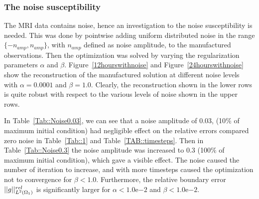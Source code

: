 \documentclass[11pt,a4paper]{article}
\begin{document}
\subsubsection{The noise susceptibility}
The MRI data contains noise, hence an investigation to the noise susceptibility is needed. This was done by pointwise adding uniform distributed noise in the range $\lbrace -n_{amp} , n_{amp} \rbrace $, with $n_{amp}$ defined as noise amplitude, to the manufactured observations. Then the optimization was solved by varying the regularization parameters $\alpha$ and $\beta$. Figure~\ref{12hourswithnoise} and Figure~\ref{24hourswithnoise} show the reconstruction of the manufactured solution at
different noise levels with $\alpha=0.0001$ and $\beta=1.0$. Clearly, the reconstruction shown in the lower rows is quite robust with respect to the various levels
of noise shown in the upper rows.      

In Table~\ref{Tab::Noise0.03}, we can see that a noise amplitude of 0.03, (10$\%$ of maximum initial condition) had negligible effect on the relative errors compared zero noise in Table~\ref{Tab::1} and Table~\ref{TAB::timesteps}. Then in Table~\ref{Tab::Noise0.3} the noise amplitude was increased to 0.3 (100$\%$ of maximum initial condition), which gave a visible effect. The noise caused the number of iteration to increase, and with more timesteps caused the optimization not to convergence for $\beta < 1.0$. Furthermore, the relative boundary error $||g||\sp{rel}_{L\sp{2}(\Omega_1)}$ is significantly larger for $\alpha< 1.0\mathrm{e}{-2} $ and $\beta < 1.0\mathrm{e}{-2}$.  
\end{document}
